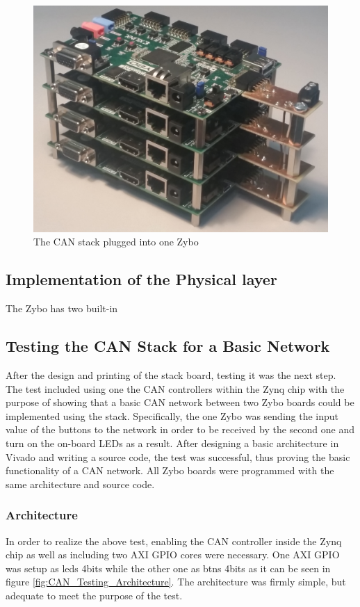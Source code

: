 \begin{figure}[H]
	\centering
	\includegraphics[width = 0.9\linewidth]{graphics/CAN_stack_picture}
	\caption{The CAN stack plugged into one Zybo}
	\label{fig:CAN_stack_picture}
\end{figure}

\subsection{Implementation of the Physical layer}\label{sub:CANphys_implementation}
The Zybo has two built-in

\subsection{Testing the CAN Stack for a Basic Network}
After the design and printing of the stack board, testing it was the next step.
The test included using one the CAN controllers within the Zynq chip with the purpose of showing that a basic CAN network between two Zybo boards could be implemented using the stack.
Specifically, the one Zybo was sending the input value of the buttons to the network in order to be received by the second one and turn on the on-board LEDs as a result.
After designing a basic architecture in Vivado and writing a source code, the test was successful, thus proving the basic functionality of a CAN network.
All Zybo boards were programmed with the same architecture and source code.

\subsubsection{Architecture}
In order to realize the above test, enabling the CAN controller inside the Zynq chip as well as including two AXI GPIO cores were necessary.
One AXI GPIO was setup as leds 4bits while the other one as btns 4bits as it can be seen in figure \ref{fig:CAN_Testing_Architecture}. The architecture was firmly simple, but adequate to meet the purpose of the test.

